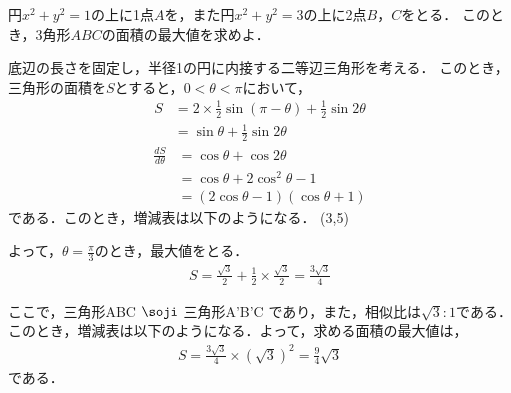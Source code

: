 
\begin{problem}
  円$x^2+y^2=1$の上に1点$A$を，また円$x^2+y^2=3$の上に2点$B$，$C$をとる．
このとき，3角形$ABC$の面積の最大値を求めよ．
\end{problem}

底辺の長さを固定し，半径1の円に内接する二等辺三角形を考える．
このとき，三角形の面積を$S$とすると，$0<\theta<\pi$において，
\begin{align*}
  S &= 2 \times \frac12 \sin (\pi-\theta) + \frac12 \sin 2\theta \\
  &= \sin\theta + \frac12 \sin 2\theta
\end{align*}
\begin{align*}
  \frac{dS}{d\theta} &= \cos \theta + \cos2\theta \\
  &= \cos\theta + 2\cos^2 \theta -1 \\
  &= (2\cos \theta -1)(\cos \theta + 1)
\end{align*}
である．このとき，増減表は以下のようになる．
\RESETKEYA
{}
\zogen(3,5)

よって，$\theta = \frac\pi3$のとき，最大値をとる．
\begin{align*}
  S = \frac{\sqrt3}2 + \frac12 \times \frac{\sqrt3}2  = \frac{3\sqrt3}4
\end{align*}

ここで，三角形ABC $\soji$ 三角形A'B'C であり，また，相似比は$\sqrt3 : 1$である．このとき，増減表は以下のようになる．よって，求める面積の最大値は，
\begin{align*}
  S = \frac{3\sqrt3}4 \times (\sqrt3)^2 = \frac94\sqrt3
\end{align*}
である．

